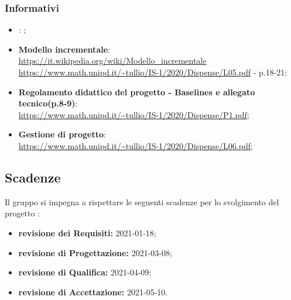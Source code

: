 \subsubsection{Informativi}
\begin{itemize}
\item \textbf{\AdR}: ;
\item \textbf{Modello incrementale}:\\ \url{https://it.wikipedia.org/wiki/Modello_incrementale} \\ \url{https://www.math.unipd.it/~tullio/IS-1/2020/Dispense/L05.pdf} - p.18-21;
\item \textbf{Regolamento didattico del progetto - Baselines e allegato tecnico(p.8-9)}:\\ \url{https://www.math.unipd.it/~tullio/IS-1/2020/Dispense/P1.pdf};
\item \textbf{Gestione di progetto}:\\ \url{https://www.math.unipd.it/~tullio/IS-1/2020/Dispense/L06.pdf};

\end{itemize}

\subsection{Scadenze}
Il gruppo \Omicron{} si impegna a rispettare le seguenti scadenze per lo svolgimento del progetto \nameproject{}:
\begin{itemize}
\item \textbf{revisione dei Requisiti:} 2021-01-18;
\item \textbf{revisione di Progettazione:} 2021-03-08;
\item \textbf{revisione di Qualifica:} 2021-04-09;
\item \textbf{revisione di Accettazione:} 2021-05-10.
\end{itemize}